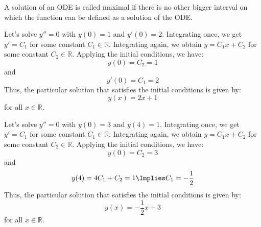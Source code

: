 \begin{definition}
    A solution of an ODE is called maximal if there is no other bigger interval on which the function can be defined as a solution of the ODE.
\end{definition}

\begin{eg}
    Let's solve $y'' = 0$ with $y(0) = 1$ and $y'(0) = 2$. Integrating once, we get $y' = C_1$ for some constant $C_1 \in \mathbb{R}$. Integrating again, we obtain $y = C_1 x + C_2$ for some constant $C_2 \in \mathbb{R}$. Applying the initial conditions, we have:
    \[
        y(0) = C_2 = 1
    \]
    and
    \[
        y'(0) = C_1 = 2
    \]
    Thus, the particular solution that satisfies the initial conditions is given by:
    \[
        y(x) = 2x + 1
    \]
    for all $x \in \mathbb{R}$.
\end{eg}

\begin{eg}
    Let's solve $y'' = 0$ with $y(0) = 3$ and $y(4) = 1$. Integrating once, we get $y' = C_1$ for some constant $C_1 \in \mathbb{R}$. Integrating again, we obtain $y = C_1 x + C_2$ for some constant $C_2 \in \mathbb{R}$. Applying the initial conditions, we have:
    \[
        y(0) = C_2 = 3
    \]
    and
    \[
        y(4) = 4C_1 + C_2 = 1 \Implies C_1 = -\frac{1}{2}
    \]
    Thus, the particular solution that satisfies the initial conditions is given by:
    \[
        y(x) = -\frac{1}{2}x + 3
    \]
    for all $x \in \mathbb{R}$.
\end{eg}

